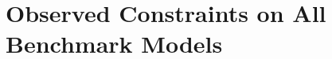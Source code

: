 \section{Observed Constraints on All Benchmark Models} \label{ sec::Result::exclLimit::nonBenchMark }




